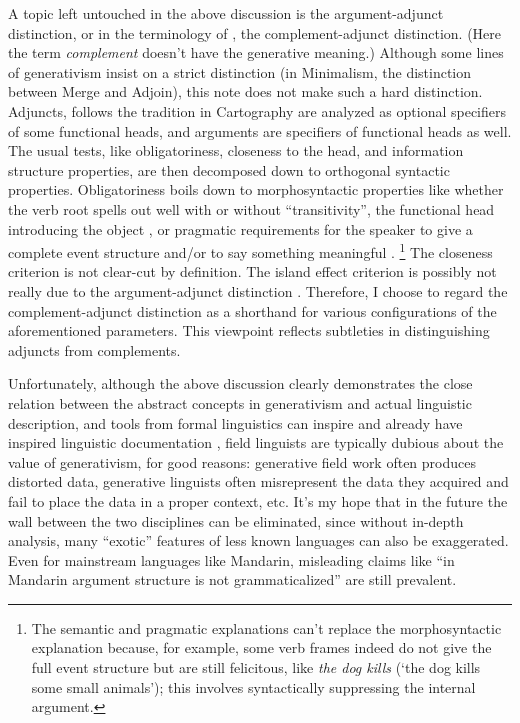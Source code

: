 \documentclass[UTF8, a4paper, oneside, scheme=plain, 12pt]{ctexbook}
\newcommand*{\citechap}[1]{Ch.~{#1}}
\newcommand*{\term}[1]{\emph{#1}}
\newcommand{\form}[1]{\emph{#1}}
\newcommand{\translate}[1]{`#1'}
\begin{document}
{A topic left untouched in the above discussion 
is the argument-adjunct distinction, 
or in the terminology of \citet{cgel}, 
the complement-adjunct distinction.
(Here the term \term{complement} doesn't have the generative meaning.)
Although some lines of generativism insist on a strict distinction
(in Minimalism, the distinction between Merge and Adjoin), 
this note does not make such a hard distinction. 
Adjuncts, follows the tradition in Cartography 
are analyzed as optional specifiers of some functional heads, 
and arguments are specifiers of functional heads as well.
The usual tests, like obligatoriness, closeness to the head, 
and information structure properties, are then decomposed down to 
orthogonal syntactic properties.
Obligatoriness boils down to morphosyntactic properties 
like whether the verb root spells out well with or without ``transitivity'',
the functional head introducing the object \citep[\citechap{10}]{siddiqi2009syntax},
or pragmatic requirements for the speaker to 
give a complete event structure \citep{grimshaw1993obligatory}
and/or to say something meaningful \citep{goldberg2001pragmatics}.
\footnote{
    The semantic and pragmatic explanations can't replace 
    the morphosyntactic explanation because, for example,
    some verb frames indeed do not give the full event structure 
    but are still felicitous, like \form{the dog kills} 
    (\translate{the dog kills some small animals});
    this involves syntactically suppressing the internal argument.
}
The closeness criterion is not clear-cut by definition.
The island effect criterion is possibly not really due to the argument-adjunct distinction
\citep{mcinnerney2023argument}.
Therefore, I choose to regard the complement-adjunct distinction as a shorthand 
for various configurations of the aforementioned parameters. 
This viewpoint reflects subtleties in distinguishing adjuncts from complements.

Unfortunately, although the above discussion clearly demonstrates 
the close relation between the abstract concepts in generativism 
and actual linguistic description, 
and tools from formal linguistics can inspire and already have inspired 
linguistic documentation \citep{rice2006let},
field linguists are typically dubious about  
the value of generativism,
for good reasons: 
generative field work often produces distorted data, 
generative linguists often misrepresent the data they acquired 
and fail to place the data in a proper context, etc.
It's my hope that in the future the wall 
between the two disciplines can be eliminated,
since without in-depth analysis, 
many ``exotic'' features of less known languages 
can also be exaggerated.
Even for mainstream languages like Mandarin, 
misleading claims like ``in Mandarin argument structure is not grammaticalized''
are still prevalent.

}
\end{document}
